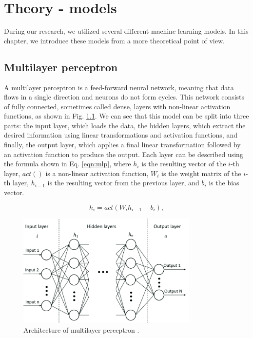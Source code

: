 
\chapter{Theory - models}
\label{chap:thoery}

During our research, we utilized several different machine learning models. In this chapter, we introduce these models from a more theoretical point of view.

\section{Multilayer perceptron}
\label{MLP}

A multilayer perceptron is a feed-forward neural network, meaning that data flows in a single direction and neurons do not form cycles. This network consists of fully connected, sometimes called dense, layers with non-linear activation functions, as shown in Fig. \ref{fig:mlp}. We can see that this model can be split into three parts: the input layer, which loads the data, the hidden layers, which extract the desired information using linear transformations and activation functions, and finally, the output layer, which applies a final linear transformation followed by an activation function to produce the output. Each layer can be described using the formula shown in Eq. \ref{eqn:mlp}, where $h_i$ is the resulting vector of the $i$-th layer, $act()$ is a non-linear activation function, $W_i$ is the weight matrix of the $i$-th layer, $h_{i-1}$ is the resulting vector from the previous layer, and $b_i$ is the bias vector.

\begin{equation}
	\label{eqn:mlp}
	h_i = act(W_i h_{i-1} + b_i),
\end{equation}

\begin{figure}[!h]
	\centering
	
	\includegraphics[width=0.8\textwidth]{images/MLP_arch.png}
	
	\caption{Architecture of multilayer perceptron \cite{MLParch}.}
	\label{fig:mlp}
\end{figure} 

